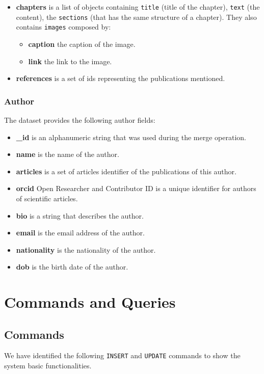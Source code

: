 \documentclass{Configuration_Files/PoliMi3i_thesis}
\begin{document}
\begin{itemize}
\begin{itemize}
				\end{itemize}
\item \textbf{chapters} is a list of objects containing \verb |title| (title of the chapter), \verb |text| (the content),
	the \verb |sections| (that has the same structure of a chapter). They also contains \verb |images| composed by:
				\begin{itemize}
					\item \textbf{caption} the caption of the image.
					\item \textbf{link} the link to the image.
				\end{itemize}
\item \textbf{references} is a set of ids representing the publications mentioned.
\end{itemize}
\bigskip

\subsection{Author}
The dataset provides the following author fields:
\begin{itemize}
\item \textbf{\_id} is an alphanumeric string that was used during the merge operation.
\item \textbf{name} is the name of the author.
\item \textbf{articles} is a set of articles identifier of the publications of this author.
\item \textbf{orcid} Open Researcher and Contributor ID is a unique identifier for authors of scientific articles.
\item \textbf{bio} is a string that describes the author.
\item \textbf{email} is the email address of the author.
\item \textbf{nationality} is the nationality of the author.
\item \textbf{dob} is the birth date of the author.
\end{itemize}


\chapter{Commands and Queries}
\label{ch:ceq}
\section{Commands}
We have identified the following \verb |INSERT| and \verb |UPDATE| commands to show the system basic functionalities.
\end{document}

